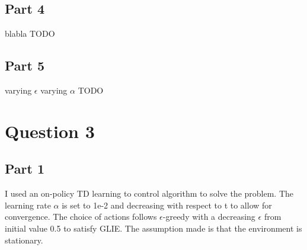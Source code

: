 \documentclass{article}
\begin{document}
    \subsection{Part 4}\label{subsec:part-4}
    blabla TODO

    \subsection{Part 5}\label{subsec:part-5}
    varying $\epsilon$
    varying $\alpha$
    TODO


    \section{Question 3}\label{sec:question-3}

    \subsection{Part 1}\label{subsec:part-13}
    I used an on-policy TD learning to control algorithm to solve the problem.
    The learning rate $\alpha$ is set to 1e-2 and decreasing with respect to t to allow for convergence.
    The choice of actions follows $\epsilon$-greedy with a decreasing $\epsilon$ from initial value 0.5 to satisfy GLIE.
    The assumption made is that the environment is stationary.
\end{document}
